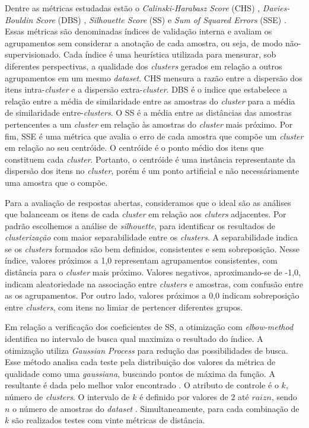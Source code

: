 Dentre as métricas estudadas estão o \textit{Calinski-Harabasz Score} (CHS) \cite{calinskiharabasz1974}, \textit{Davies-Bouldin Score} (DBS) \cite{daviesbouldin1979}, \textit{Silhouette Score} (SS) \cite{rousseeuw1987} e \textit{Sum of Squared Errors} (SSE) \cite{maimon2005}. Essas métricas são denominadas índices de validação interna e avaliam os agrupamentos sem considerar a anotação de cada amostra, ou seja, de modo não-supervisionado. Cada índice é uma heurística utilizada para mensurar, sob diferentes perspectivas, a qualidade dos \textit{clusters} gerados em relação a outros agrupamentos em um mesmo \textit{dataset}. CHS mensura a razão entre a dispersão dos itens intra-\textit{cluster} e a dispersão extra-\textit{cluster}. DBS é o indice que estabelece a relação entre a média de similaridade entre as amostras do \textit{cluster} para a média de similaridade entre-\textit{clusters}. O SS é a média entre as distâncias das amostras pertencentes a um \textit{cluster} em relação às amostras do \textit{cluster} mais próximo. Por fim, SSE é uma métrica que avalia o erro de cada amostra que compõe um \textit{cluster} em relação ao seu centróide. O centróide é o ponto médio dos itens que constituem cada \textit{cluster}. Portanto, o centróide é uma instância representante da dispersão dos itens no \textit{cluster}, porém é um ponto artificial e não necessáriamente uma amostra que o compõe.

Para a avaliação de respostas abertas, consideramos que o ideal são as análises que balanceam os itens de cada \textit{cluster} em relação aos \textit{cluters} adjacentes. Por padrão escolhemos a análise de \textit{silhouette}, para identificar os resultados de \textit{clusterização} com maior separabilidade entre os \textit{clusters}. A separabilidade indica se os \textit{clusters} formados são bem definidos, consistentes e sem sobreposição. Nesse índice, valores próximos a 1,0 representam agrupamentos consistentes, com distância para o \textit{cluster} mais próximo. Valores negativos, aproximando-se de -1,0, indicam aleatoriedade na associação entre \textit{clusters} e amostras, com confusão entre as os agrupamentos. Por outro lado, valores próximos a 0,0 indicam sobreposição entre \textit{clusters}, com itens no limiar de pertencer diferentes grupos. 

Em relação a verificação dos coeficientes de SS, a otimização com \textit{elbow-method} identifica no intervalo de busca qual maximiza o resultado do índice. A otimização utiliza \textit{Gaussian Process} para redução das possibilidades de busca. Esse método analisa cada teste pela distribuição dos valores da métrica de qualidade como uma \textit{gaussiana}, buscando pontos de máxima da função. A resultante é dada pelo melhor valor encontrado \cite{spalenza2019}. O atributo de controle é o $ k $, número de \textit{clusters}. O intervalo de $ k $ é definido por valores de $ 2 $ até $ raiz n $, sendo $ n $ o número de amostras do \textit{dataset} \cite{han2011}. Simultaneamente, para cada combinação de $ k $ são realizados testes com vinte métricas de distância.

